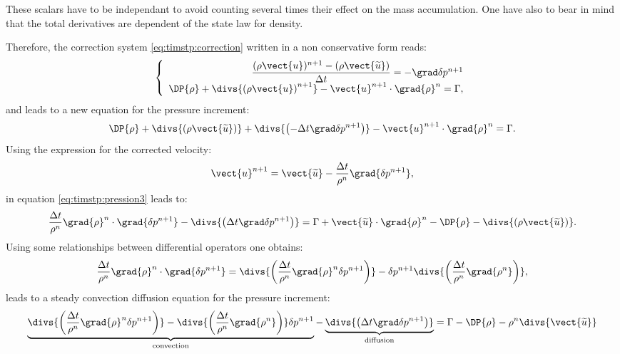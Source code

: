 These scalars have to be independant to avoid counting several times
their effect on  the mass accumulation.
One have also to bear in mind that the total derivatives are dependent of the state law for density.

Therefore, the correction system \eqref{eq:timstp:correction} written in a non conservative form reads:
\begin{equation}
\left\{
  \begin{array}{rcl}
  \dfrac{(\rho \vect{u})^{n+1} - (\rho\vect{\widetilde{u}})}{\Delta t} = - \grad \delta p^{n+1} \\
  \DP{\rho} + \divs{ \left( \rho \vect{u} \right)^{n+1} } - \vect{u}^{n+1} \cdot \grad{\rho}^n = \Gamma,
  \end{array}
  \right.
\label{eq:timstp:correction3}
\end{equation}
and leads to a new equation for the pressure increment:
\begin{equation}
\DP{\rho} + \divs{ \left( \rho \vect{\widetilde{u}} \right) }
+ \divs{ \left( -\Delta t \grad \delta p^{n+1} \right) } - \vect{u}^{n+1} \cdot \grad{\rho}^n = \Gamma.
\label{eq:timstp:pression3}
\end{equation}
Using the expression for the corrected velocity:
\begin{equation}
\vect{u}^{n+1} = \vect{\widetilde{u}} - \dfrac{\Delta t}{\rho^n} \grad{\delta p^{n+1}},
\end{equation}
in equation \eqref{eq:timstp:pression3} leads to:
%
\begin{equation}
\dfrac{\Delta t}{\rho^n} \grad{\rho}^n \cdot \grad{\delta p^{n+1}}
- \divs{ \left( \Delta t \grad \delta p^{n+1} \right) } = \Gamma
+ \vect{\widetilde{u}} \cdot \grad{\rho}^n - \DP{\rho}
- \divs{ \left( \rho \vect{\widetilde{u}} \right) }.
\label{eq:timstp:pression4}
\end{equation}
%
Using some relationships between differential operators one obtains:
\begin{equation}
\dfrac{\Delta t}{\rho^n}\grad{\rho}^n \cdot \grad{\delta p^{n+1}}
= \divs{ \left( \dfrac{\Delta t}{\rho^n}\grad{\rho}^n \delta p^{n+1} \right) }
- \delta p^{n+1} \divs{ \left( \dfrac{\Delta t}{\rho^n} \grad{\rho^n} \right) },
\end{equation}
leads to a steady convection diffusion equation for the pressure increment:
\begin{equation}
\underbrace{ \divs{ \left( \dfrac{\Delta t}{\rho^n} \grad{\rho}^n \delta p^{n+1} \right) }
           - \divs{ \left( \dfrac{\Delta t}{\rho^n} \grad{\rho^n} \right) } \delta p^{n+1}
}_{\text{convection}}
-
\underbrace{
  \divs{ \left( \Delta t \grad \delta p^{n+1} \right) }
}_{\text{diffusion}}
 = \Gamma - \DP{\rho}
- \rho^n \divs{\vect{\widetilde{u}}}
\label{eq:timstp:pression5}
\end{equation}
